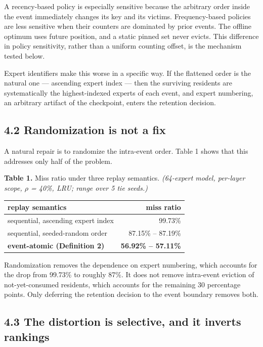 \documentclass[
  10pt,
  letterpaper,
  10pt]{article}
\newcounter{none} %
\begin{document}
A recency-based policy is especially sensitive because the arbitrary
order inside the event immediately changes its key and its victims.
Frequency-based policies are less sensitive when their counters are
dominated by prior events. The offline optimum uses future position, and
a static pinned set never evicts. This difference in policy sensitivity,
rather than a uniform counting offset, is the mechanism tested below.

Expert identifiers make this worse in a specific way. If the flattened
order is the natural one --- ascending expert index --- then the
surviving residents are systematically the highest-indexed experts of
each event, and expert numbering, an arbitrary artifact of the
checkpoint, enters the retention decision.

\subsection{4.2 Randomization is not a
fix}\label{randomization-is-not-a-fix}

A natural repair is to randomize the intra-event order. Table 1 shows
that this addresses only half of the problem.

\textbf{Table 1.} Miss ratio under three replay semantics.
\emph{(64-expert model, per-layer scope, \(\rho\) = 40\%, LRU; range
over 5 tie seeds.)}

{\def\LTcaptype{none} %
\begin{longtable}[]{@{}lr@{}}
\toprule\noalign{}
replay semantics & miss ratio \\
\midrule\noalign{}
\endhead
\bottomrule\noalign{}
\endlastfoot
sequential, ascending expert index & 99.73\% \\
sequential, seeded-random order & 87.15\% -- 87.19\% \\
\textbf{event-atomic (Definition 2)} & \textbf{56.92\% -- 57.11\%} \\
\end{longtable}
}

Randomization removes the dependence on expert numbering, which accounts
for the drop from 99.73\% to roughly 87\%. It does not remove
intra-event eviction of not-yet-consumed residents, which accounts for
the remaining 30 percentage points. Only deferring the retention
decision to the event boundary removes both.

\subsection{4.3 The distortion is selective, and it inverts
rankings}\label{the-distortion-is-selective-and-it-inverts-rankings}
\end{document}

